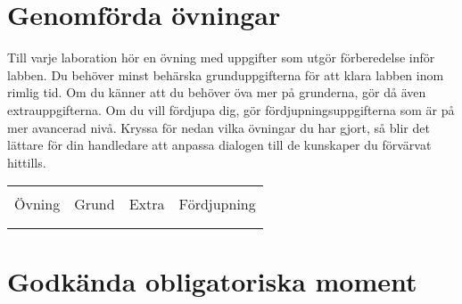 
\label{progress-protocoll}


\section*{Genomförda övningar}

\vspace{1em}\noindent
{Till varje laboration hör en övning med uppgifter som utgör förberedelse inför labben. Du behöver minst behärska grunduppgifterna för att klara labben inom rimlig tid. Om du känner att du behöver öva mer på grunderna, gör då även extrauppgifterna. Om du vill fördjupa dig, gör fördjupningsuppgifterna som är på mer avancerad nivå. Kryssa för nedan vilka övningar du har gjort, så blir det lättare för din handledare att anpassa dialogen till de kunskaper du förvärvat hittills.}


\newcommand{\TickBox}{\raisebox{-.50ex}{\Large$\square$}}
\newcommand{\ExeRow}[1]{\hyperref[section:exe:#1]{\texttt{#1}} & \TickBox  &  \TickBox &  \TickBox  \\ } %

\begin{table}[h]
\vspace{2em}
\begin{tabular}{lccc}
\hline \\ %
{\sffamily Övning} &
{\sffamily Grund} &
{\sffamily Extra} &
{\sffamily Fördjupning} \\[1em] \hline  %
\\


\\\hline%
\end{tabular}
\end{table}

\newpage

\section*{Godkända obligatoriska moment}

